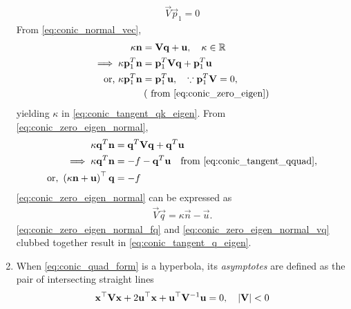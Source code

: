 \documentclass[journal,12pt,twocolumn]{IEEEtran}
\renewcommand\thesection{\arabic{section}}
\renewcommand\thesubsection{\thesection.\arabic{subsection}}
\begin{document}
\begin{enumerate}[label=\thesubsection.\arabic*.,ref=\thesubsection.\theenumi]
\begin{align}
\vec{V}\vec{p}_1 = 0
\label{eq:conic_zero_eigen}
\end{align}
From \eqref{eq:conic_normal_vec},
\begin{align}
\label{eq:conic_zero_eigen_normal}
\kappa \mathbf{n} &= \mathbf{V} \mathbf{q}+\mathbf{u}, \quad \kappa \in \mathbb{R}
\\
\implies \kappa \mathbf{p}_1^T\mathbf{n} &= \mathbf{p}_1^T\mathbf{V} \mathbf{q}+\mathbf{p}_1^T\mathbf{u}
\\
\text{or, } \kappa \mathbf{p}_1^T\mathbf{n} &= \mathbf{p}_1^T\mathbf{u},  \quad \because \mathbf{p}_1^T \mathbf{V} = 0, 
\\
	&\left(\text{ from } \eqref{eq:conic_zero_eigen}\right)
\end{align}
yielding $\kappa$ in \eqref{eq:conic_tangent_qk_eigen}. From \eqref{eq:conic_zero_eigen_normal},
\begin{align}
\kappa \mathbf{q}^T\mathbf{n} &= \mathbf{q}^T\mathbf{V} \mathbf{q}+\mathbf{q}^T\mathbf{u}
\\
\implies \kappa \mathbf{q}^T\mathbf{n} &= -f-\mathbf{q}^T\mathbf{u} \quad \text{from } \eqref{eq:conic_tangent_qquad},
\\
	\text{or, } \left(\kappa \mathbf{n}+\mathbf{u}\right)^{\top}\mathbf{q} &= -f
\label{eq:conic_zero_eigen_normal_fq}
\end{align}
\eqref{eq:conic_zero_eigen_normal} can be expressed as
\begin{align}
\label{eq:conic_zero_eigen_normal_vq}
\vec{V} \vec{q} = \kappa \vec{n} - \vec{u}.
\end{align}
\eqref{eq:conic_zero_eigen_normal_fq} and \eqref{eq:conic_zero_eigen_normal_vq} clubbed together result in \eqref{eq:conic_tangent_q_eigen}.
\item When \eqref{eq:conic_quad_form} is a hyperbola, its  {\em asymptotes}  are defined as the pair of intersecting straight lines 
  \begin{align}
  \label{eq:asymp_quad_form}
  \mathbf{x}^{\top}\mathbf{V}\mathbf{x}+2\mathbf{u}^{\top}\mathbf{x}+\mathbf{u}^{\top}\mathbf{V}^{-1}\mathbf{u}=0, \quad \left\vert\mathbf{V}\right\vert < 0
  \end{align}
  

\end{enumerate}
\end{document}
